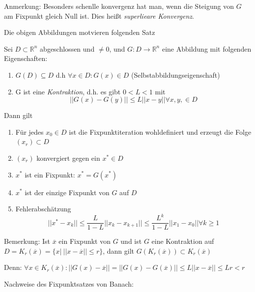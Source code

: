 \documentclass[10pt,a4paper]{article}
\begin{document}
Anmerkung:
Besonders schenlle konvergenz hat man, wenn die Steigung von $G$ am Fixpunkt gleich Null ist. Dies heißt \emph{superlieare Konvergenz}.


Die obigen Abbildungen motvieren folgenden Satz

\begin{satz}

Sei $D \subset \mathbb{R}^{n}$ abgeschlossen und $\not= 0$, und $G: D \rightarrow \mathbb{R}^{n}$ eine Abbildung mit folgenden Eigenschaften:

\begin{enumerate}
\item $G(D) \subseteq D$ d.h $\forall x \in D: G(x) \in D$ (Selbstabbildungseigenschaft)
\item G ist eine \emph{Kontraktion}, d.h. es gibt $0 < L < 1$ mit $$||G(x)-G(y)|| \leq L||x-y|| \forall x,y, \in D$$
\end{enumerate}

Dann gilt

\begin{enumerate}
\item Für jedes $x_0 \in D$ ist die Fixpunktiteration wohldefiniert und erzeugt die Folge $(x_r) \subset D$
\item $(x_r)$ konvergiert gegen ein $x^{*} \in D$
\item $x^{*}$ ist ein Fixpunkt: $x^{*} = G(x^{*})$
\item $x^{*}$ ist der einzige Fixpunkt von $G$ auf $D$
\item Fehlerabschätzung $$||x^{*}-x_k|| \leq \frac{L}{1-L}||x_k-x_{k+1}|| \leq \frac{L^{k}}{1-L}||x_1-x_0|| \forall k \geq 1$$
\end{enumerate}
\end{satz}



Bemerkung: Ist $\overline{x}$ ein Fixpunkt von $G$ und ist $G$ eine Kontraktion auf $D=K_r(\overline{x})=\{ x | ~ ||x-\overline{x}|| \leq r\}$, dann gilt $G(K_r(\overline{x})) \subset K_r(\overline{x})$

Denn:
$\forall x \in K_r (\overline{x}): ||G(x)-\overline{x}||=||G(x)-G(\overline{x})|| \leq L ||x-\overline{x}||\leq Lr < r$

Nachweise des Fixpunktsatzes von Banach:
\end{document}
